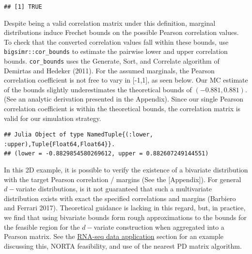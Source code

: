 \documentclass{article}
\newenvironment{Shaded}{\begin{snugshade}}{\end{snugshade}}
\newcommand{\AttributeTok}[1]{\textcolor[rgb]{0.77,0.63,0.00}{#1}}
\newcommand{\DecValTok}[1]{\textcolor[rgb]{0.00,0.00,0.81}{#1}}
\newcommand{\FloatTok}[1]{\textcolor[rgb]{0.00,0.00,0.81}{#1}}
\newcommand{\FunctionTok}[1]{\textcolor[rgb]{0.00,0.00,0.00}{#1}}
\newcommand{\NormalTok}[1]{#1}
\newcommand{\SpecialCharTok}[1]{\textcolor[rgb]{0.00,0.00,0.00}{#1}}
\begin{document}
\begin{verbatim}
## [1] TRUE
\end{verbatim}

Despite being a valid correlation matrix under this definition, marginal
distributions induce Frechet bounds on the possible Pearson correlation
values. To check that the converted correlation values fall within these
bounds, use \texttt{bigsimr::cor\_bounds} to estimate the pairwise lower
and upper correlation bounds. \texttt{cor\_bounds} uses the Generate,
Sort, and Correlate algorithm of Demirtas and Hedeker (2011). For the
assumed marginals, the Pearson correlation coefficient is not free to
vary in {[}-1,1{]}, as seen below. Our MC estimate of the bounds
slightly underestimates the theoretical bounds of \((-0.881, 0.881)\).
(See an analytic derivation presented in the Appendix). Since our single
Pearson correlation coefficient is within the theoretical bounds, the
correlation matrix is valid for our simulation strategy.

\begin{Shaded}
\end{Shaded}

\begin{verbatim}
## Julia Object of type NamedTuple{(:lower, :upper),Tuple{Float64,Float64}}.
## (lower = -0.8829854580269612, upper = 0.882607249144551)
\end{verbatim}

In this 2D example, it is possible to verify the existence of a
bivariate distribution with the target Pearson correlation / margins
(See the {[}Appendix{]}). For general \(d-\)variate distributions, is it
not guaranteed that such a multivariate distribution exists with exact
the specified correlations and margins (Barbiero and Ferrari 2017).
Theoretical guidance is lacking in this regard, but, in practice, we
find that using bivariate bounds form rough approximations to the bounds
for the feasible region for the \(d-\)variate construction when
aggregated into a Pearson matrix. See the
\protect\hyperlink{examples}{RNA-seq data application} section for an
example discussing this, NORTA feasibility, and use of the nearest PD
matrix algorithm.
\end{document}

